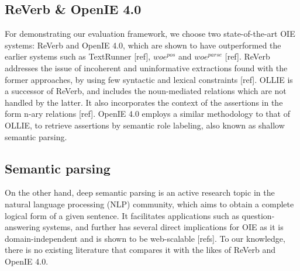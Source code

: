 \documentclass{llncs}
\begin{document}
\subsection{ReVerb \& OpenIE 4.0}
For demonstrating our evaluation framework, we choose two state-of-the-art OIE systems: ReVerb and OpenIE 4.0, which are shown to have outperformed the earlier systems such as TextRunner [ref], $woe^{pos}$ and $woe^{parse}$ [ref]. ReVerb addresses the issue of incoherent and uninformative extractions found with the former approaches, by using few syntactic and lexical constraints [ref]. OLLIE is a successor of ReVerb, and includes the noun-mediated relations which are not handled by the latter. It also incorporates the context of the assertions in the form n-ary relations [ref]. OpenIE 4.0 employs a similar methodology to that of OLLIE, to retrieve assertions by semantic role labeling, also known as shallow semantic parsing.

\subsection{Semantic parsing}
On the other hand, deep semantic parsing is an active research topic in the natural language processing (NLP) community, which aims to obtain a complete logical form of a given sentence. It facilitates applications such as question-answering systems, and further has several direct implications for OIE as it is domain-independent and is shown to be web-scalable [refs]. To our knowledge, there is no existing literature that compares it with the likes of ReVerb and OpenIE 4.0. 
\end{document}
